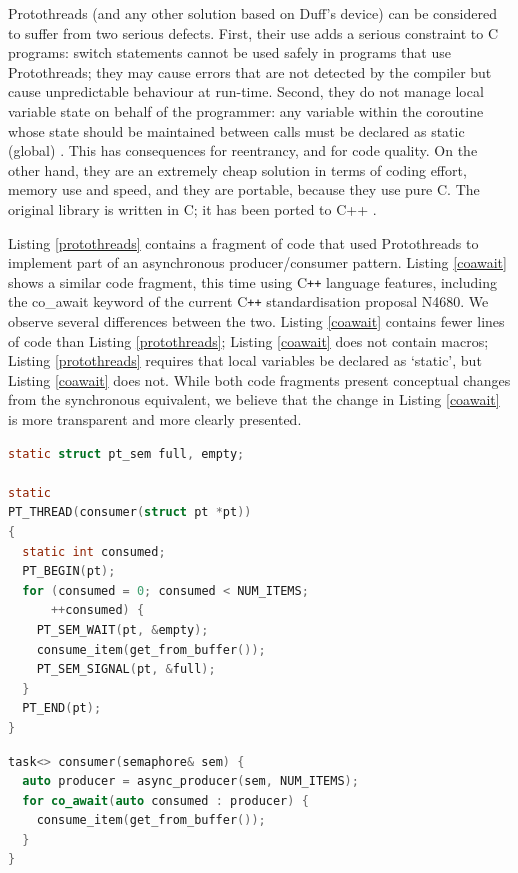 \documentclass[format=acmsmall, review=false, screen=false]{acmart}
\begin{document}
Protothreads (and any other solution based on Duff’s device) can be considered to suffer from two serious defects. First, their use adds a serious constraint to C programs: switch statements cannot be used safely in programs that use Protothreads; they may cause errors that are not detected by the compiler but cause unpredictable behaviour at run-time. Second, they do not manage local variable state on behalf of the programmer: any variable within the coroutine whose state should be maintained between calls must be declared as static (global) \cite{Dunkels2005b}. This has consequences for reentrancy, and for code quality. On the other hand, they are an extremely cheap solution in terms of coding effort, memory use and speed, and they are portable, because they use pure C. The original library is written in C; it has been ported to C++ \cite{Paisley2006}.

Listing \ref{protothreads} contains a fragment of code that used Protothreads to implement part of an asynchronous producer/consumer pattern. Listing \ref{coawait} shows a similar code fragment, this time using C{}\verb!++! language features, including the co\_await keyword of the current C{}\verb!++! standardisation proposal N4680. We observe several differences between the two. Listing \ref{coawait} contains fewer lines of code than Listing \ref{protothreads}; Listing \ref{coawait} does not contain macros; Listing \ref{protothreads} requires that local variables be declared as ‘static’, but Listing \ref{coawait} does not. While both code fragments present conceptual changes from the synchronous equivalent, we believe that the change in Listing \ref{coawait} is more transparent and more clearly presented.

\begin{lstlisting}[language=C, caption=Fragment of Protothreads code for asynchronous producer/consumer threads, label=protothreads]
static struct pt_sem full, empty;

static
PT_THREAD(consumer(struct pt *pt))
{
  static int consumed;
  PT_BEGIN(pt);
  for (consumed = 0; consumed < NUM_ITEMS; 
      ++consumed) {
    PT_SEM_WAIT(pt, &empty);
    consume_item(get_from_buffer());
    PT_SEM_SIGNAL(pt, &full);
  }
  PT_END(pt);
}
\end{lstlisting}

\begin{lstlisting}[language=C++, caption=C++ code fragment using co\_await for asynchronous producer/consumer threads, label=coawait]
task<> consumer(semaphore& sem) {
  auto producer = async_producer(sem, NUM_ITEMS);
  for co_await(auto consumed : producer) {
    consume_item(get_from_buffer());
  }
}
\end{lstlisting}
\end{document}
